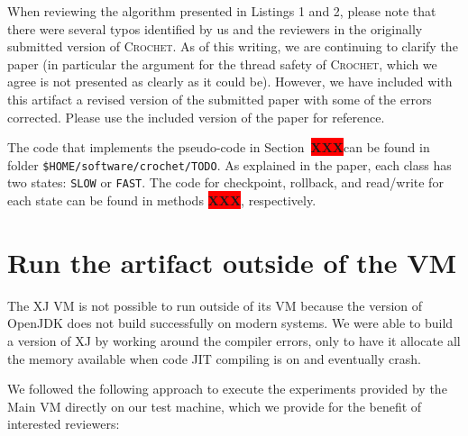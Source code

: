 \documentclass[12pt]{article}
\newcommand{\vm}[1]{\colorbox{green!20}{\texttt{\color{black}#1}}}
\newcommand{\XXX}{\colorbox{red}{\bf\color{white}XXX}}
\newcommand{\sysname}{\textsc{Crochet}\xspace}
\begin{document}
When reviewing the algorithm presented in Listings 1 and 2, please note that there were several typos identified by us and the reviewers in the originally submitted version of \sysname. As of this writing, we are continuing to clarify the paper (in particular the argument for the thread safety of \sysname, which we agree is not presented as clearly as it could be). However, we have included with this artifact a revised version of the submitted paper with some of the errors corrected. Please use the included version of the paper for reference.

The code that implements the pseudo-code in Section~\XXX can be found in folder
\vm{\$HOME/software/crochet/TODO}.  As explained in the paper, each class
has two states:  \texttt{SLOW} or \texttt{FAST}.  The code for checkpoint,
rollback, and read/write for each state can be found in methods \XXX,
respectively.

\section{Run the artifact outside of the VM}
\label{sec:extract}
\label{sec:last}

The XJ VM is not possible to run outside of its VM because the version of
OpenJDK does not build successfully on modern systems.  We were able to build a
version of XJ by working around the compiler errors, only to have it allocate
all the memory available when code JIT compiling is on and eventually crash.

We followed the following approach to execute the experiments provided by the
Main VM directly on our test machine, which we provide for the benefit of interested reviewers:
\end{document}
